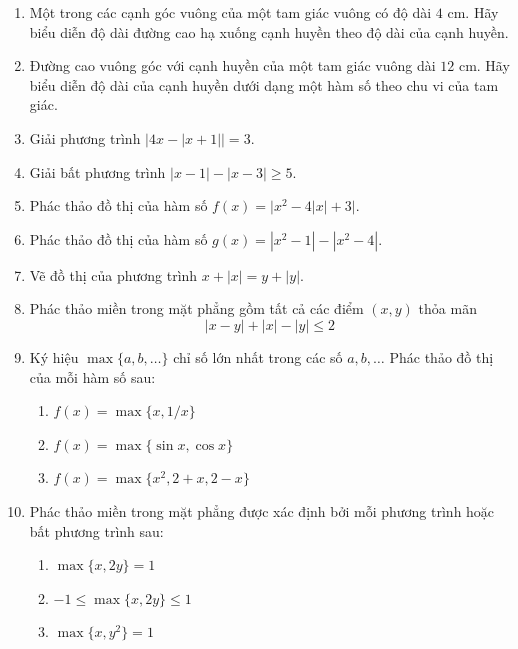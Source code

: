 \begin{minipage}[t]{0.73\textwidth}
    \vspace{0pt}
    \begin{enumerate}[label=\bfseries\arabic*., leftmargin=*, itemsep=3.2pt, topsep=0pt, parsep=0pt]
        \item Một trong các cạnh góc vuông của một tam giác vuông có độ dài $4\text{ cm}$. Hãy biểu diễn độ dài đường cao hạ xuống cạnh huyền theo độ dài của cạnh huyền.

        \item Đường cao vuông góc với cạnh huyền của một tam giác vuông dài $12\text{ cm}$. Hãy biểu diễn độ dài của cạnh huyền dưới dạng một hàm số theo chu vi của tam giác.

        \item Giải phương trình $\bigl| 4x - |x + 1| \bigr| = 3$.

        \item Giải bất phương trình $|x - 1| - |x - 3| \geqslant 5$.

        \item Phác thảo đồ thị của hàm số $f(x) = \bigl| x^2 - 4|x| + 3 \bigr|$.

        \item Phác thảo đồ thị của hàm số $g(x) = |x^2 - 1| - |x^2 - 4|$.

        \item Vẽ đồ thị của phương trình $x + |x| = y + |y|$.

        \item Phác thảo miền trong mặt phẳng gồm tất cả các điểm $(x, y)$ thỏa mãn
        \[
            |x - y| + |x| - |y| \leqslant 2
        \]

        \item Ký hiệu $\max\{a, b, \dots\}$ chỉ số lớn nhất trong các số $a, b, \dots$ Phác thảo đồ thị của mỗi hàm số sau:
        \begin{enumerate}[label=(\alph*), itemsep=1.5pt, topsep=1.5pt, parsep=0pt]
            \item $f(x) = \max\{x, 1/x\}$
            \item $f(x) = \max\{\sin x, \cos x\}$
            \item $f(x) = \max\{x^2, 2 + x, 2 - x\}$
        \end{enumerate}

        \item Phác thảo miền trong mặt phẳng được xác định bởi mỗi phương trình hoặc bất phương trình sau:
        \begin{enumerate}[label=(\alph*), itemsep=1.5pt, topsep=1.5pt, parsep=0pt]
            \item $\max\{x, 2y\} = 1$
            \item $-1 \leqslant \max\{x, 2y\} \leqslant 1$
            \item $\max\{x, y^2\} = 1$
        \end{enumerate}


\end{enumerate}
\end{minipage}
